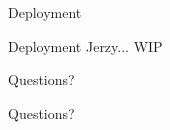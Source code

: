 \documentclass[
  9pt
  , table
  , ignorenonframetext
]{beamer}
\begin{document}
\begin{frame}{Deployment}
  \begin{block}{Deployment}
    Jerzy... WIP
  \end{block}
\end{frame}


\begin{frame}{Questions?}
  \begin{center}
    {\Huge Questions?}
  \end{center}
\end{frame}



%
%
\end{document}
